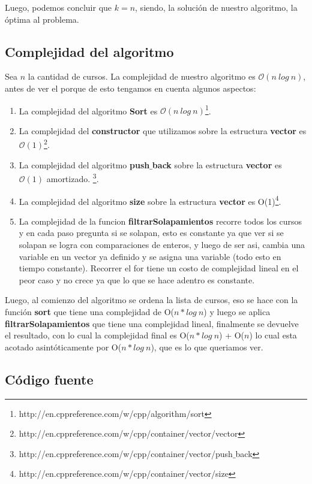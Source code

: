 Luego, podemos concluir que $k = n$, siendo, la solución de nuestro algoritmo, la óptima al problema. 

\subsection{Complejidad del algoritmo}

Sea $n$ la cantidad de cursos. La complejidad de nuestro algoritmo es $\mathcal{O}(n\ log\ n)$, antes de ver el porque de esto tengamos en cuenta algunos aspectos:
\begin{enumerate}
\item La complejidad del algoritmo \textbf{Sort} es $\mathcal{O}(n\ log\ n)$\footnote{http://en.cppreference.com/w/cpp/algorithm/sort}.
\item La complejidad del \textbf{constructor} que utilizamos sobre la estructura \textbf{vector} es $\mathcal{O}(1)$\footnote{http://en.cppreference.com/w/cpp/container/vector/vector}.
\item La complejidad del algoritmo \textbf{push$\_$back} sobre la estructura \textbf{vector} es $\mathcal{O}(1)$ amortizado. \footnote{http://en.cppreference.com/w/cpp/container/vector/push$\_$back}. 
\item La complejidad del algoritmo \textbf{size} sobre la estructura \textbf{vector} es O(1)\footnote{http://en.cppreference.com/w/cpp/container/vector/size}.
\item La complejidad de la funcion \textbf{filtrarSolapamientos} recorre todos los cursos y en cada paso pregunta si se solapan, esto es constante ya que ver si se solapan se logra con comparaciones de enteros, y luego de ser asi, cambia una variable en un vector ya definido y se asigna una variable (todo esto en tiempo constante). Recorrer el for tiene un costo de complejidad lineal en el peor caso y no crece ya que lo que se hace adentro es constante.
\end{enumerate}

Luego, al comienzo del algoritmo se ordena la lista de cursos, eso se hace con la función \textbf{sort} que tiene una complejidad de O($n*log\ n$) y luego se aplica \textbf{filtrarSolapamientos} que tiene una complejidad lineal, finalmente se devuelve el resultado, con lo cual la complejidad final es O($n*log\ n$) + O($n$) lo cual esta acotado asintóticamente por O($n*log\ n$), que es lo que queriamos ver.

\subsection{Código fuente}

